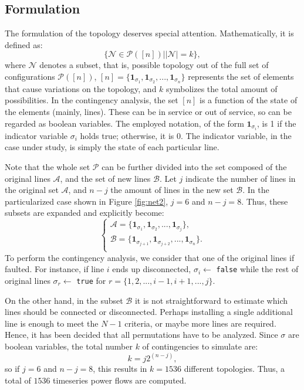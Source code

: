 \subsection{Formulation}
The formulation of the topology deserves special attention. Mathematically, it is defined as:
\begin{equation}
  \{\mathcal{N} \in \mathcal{P}([n]) \left. \right\vert |\mathcal{N}|=k \},
\end{equation}
where $\mathcal{N}$ denotes a subset, that is, possible topology out of the full set of configurations $\mathcal{P}([n])$, $[n] = \{\mathbf{1}_{\sigma_1},\mathbf{1}_{\sigma_2},...,\mathbf{1}_{\sigma_n}\}$ represents the set of elements that cause variations on the topology, and $k$ symbolizes the total amount of possibilities. In the contingency analysis, the set $[n]$ is a function of the state of the elements (mainly, lines). These can be in service or out of service, so can be regarded as boolean variables. The employed notation, of the form $\mathbf{1}_{\sigma_i}$, is 1 if the indicator variable $\sigma_i$ holds true; otherwise, it is 0. The indicator variable, in the case under study, is simply the state of each particular line.

Note that the whole set $\mathcal{P}$ can be further divided into the set composed of the original lines $\mathcal{A}$, and the set of new lines $\mathcal{B}$. Let $j$ indicate the number of lines in the original set $\mathcal{A}$, and $n-j$ the amount of lines in the new set $\mathcal{B}$. In the particularized case shown in Figure \ref{fig:net2}, $j=6$ and $n-j=8$. Thus, these subsets are expanded and explicitly become:
\begin{equation}
  \begin{cases}
  \mathcal{A} = \{\mathbf{1}_{\sigma_{1}}, \mathbf{1}_{\sigma_{2}},..., \mathbf{1}_{\sigma_{j}}\}, \\
  \mathcal{B} = \{\mathbf{1}_{\sigma_{j+1}}, \mathbf{1}_{\sigma_{j+2}},..., \mathbf{1}_{\sigma_{n}}\}. \\
\end{cases}
\end{equation}
To perform the contingency analysis, we consider that one of the original lines if faulted. For instance, if line $i$ ends up disconnected, $\sigma_i\gets$ \texttt{false} while the rest of original lines $\sigma_r\gets$ \texttt{true} for $r=\{1,2,...,i-1,i+1,...,j\}$.

On the other hand, in the subset $\mathcal{B}$ it is not straightforward to estimate which lines should be connected or disconnected. Perhaps installing a single additional line is enough to meet the $N-1$ criteria, or maybe more lines are required. Hence, it has been decided that all permutations have to be analyzed. Since $\sigma$ are boolean variables, the total number $k$ of contingencies to simulate are:
\begin{equation}
  k = j 2^{(n-j)},
\end{equation}
so if $j=6$ and $n-j=8$, this results in $k=1536$ different topologies. Thus, a total of $1536$ timeseries power flows are computed. 

